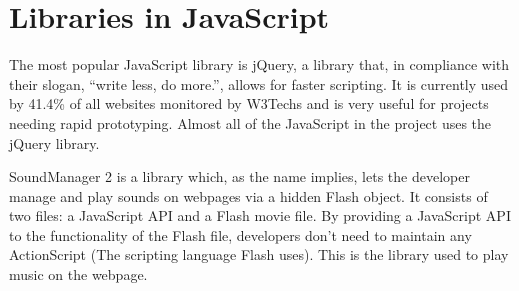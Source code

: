 \section{Libraries in JavaScript}
The most popular JavaScript library is jQuery\cite{jquery11}, 
a library that, in compliance with their slogan, ``write less, do more.'', 
allows for faster scripting. It is currently used by 41.4\% of all
websites monitored by W3Techs \cite{W3Tech11} and is very useful for projects
needing rapid prototyping. Almost all of the JavaScript in the project uses the jQuery library.

SoundManager 2\cite{Schiller07} is a library which, as the name implies, lets the developer
manage and play sounds on webpages via a hidden Flash object. It consists of two
files: a JavaScript API and a Flash movie file. By providing a
JavaScript API to the functionality of the Flash file, developers don't need to
maintain any ActionScript (The scripting language Flash uses). 
This is the library used to play music on the webpage.